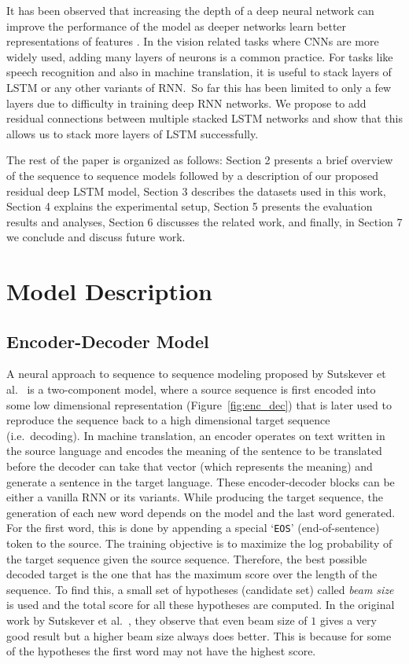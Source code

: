 It has been observed that increasing the depth of a deep neural network can improve the performance of the model \cite{Simonyan2014VeryDC,he2015deep} as deeper networks learn better representations of features \cite{farabet2013learning}. In the vision related tasks where CNNs are more widely used, adding many layers of neurons is a common practice. For tasks like speech recognition \cite{li2015constructing} and also in machine translation, it is useful to stack layers of LSTM or any other variants of RNN.\ So far this has been limited to only a few layers due to difficulty in training deep RNN networks. We propose to add residual connections between multiple stacked LSTM networks and show that this allows us to stack more layers of LSTM successfully.
 
The rest of the paper is organized as follows: Section 2 presents a brief overview of the sequence to sequence models followed by a description of our proposed residual deep LSTM model, Section 3 describes the datasets used in this work, Section 4 explains the experimental setup, Section 5 presents the evaluation results and analyses, Section 6 discusses the related work, and finally, in Section 7 we conclude and discuss future work.
 
 
\section{Model Description}
\subsection{Encoder-Decoder Model}
A neural approach to sequence to sequence modeling proposed by Sutskever et al.~\cite{SutskeverVL14} is a two-component model, where a source sequence is first encoded into some low dimensional representation (Figure~\ref{fig:enc_dec}) that is later used to reproduce the sequence back to a high dimensional target sequence (i.e.\ decoding). In machine translation, an encoder operates on text written in the source language and encodes the meaning of the sentence to be translated before the decoder can take that vector (which represents the meaning) and generate a sentence in the target language. These encoder-decoder blocks can be either a vanilla RNN or its variants. While producing the target sequence, the generation of each new word depends on the model and the last word generated. For the first word, this is done by appending a special `\texttt{EOS}' (end-of-sentence) token to the source.
The training objective is to maximize the log probability of the target sequence given the source sequence. Therefore, the best possible decoded target is the one that has the maximum score over the length of the sequence. To find this, a small set of hypotheses (candidate set) called \emph{beam size} is used and the total score for all these hypotheses are computed. In the original work by Sutskever et al.~\cite{SutskeverVL14}, they observe that even beam size of $1$ gives a very good result but a higher beam size always does better. This is because for some of the hypotheses the first word may not have the highest score.

